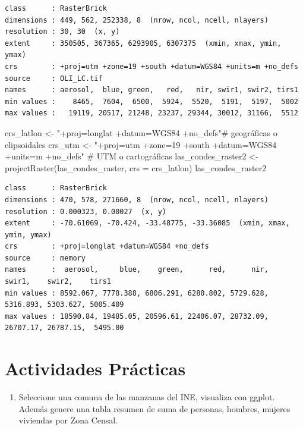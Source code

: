 \documentclass[
  letterpaper,
  DIV=11,
  numbers=noendperiod]{scrreprt}
\newenvironment{Shaded}{\begin{snugshade}}{\end{snugshade}}
\newcommand{\AttributeTok}[1]{\textcolor[rgb]{0.40,0.45,0.13}{#1}}
\newcommand{\CommentTok}[1]{\textcolor[rgb]{0.37,0.37,0.37}{#1}}
\newcommand{\FunctionTok}[1]{\textcolor[rgb]{0.28,0.35,0.67}{#1}}
\newcommand{\NormalTok}[1]{\textcolor[rgb]{0.00,0.23,0.31}{#1}}
\newcommand{\OtherTok}[1]{\textcolor[rgb]{0.00,0.23,0.31}{#1}}
\newcommand{\StringTok}[1]{\textcolor[rgb]{0.13,0.47,0.30}{#1}}
\providecommand{\tightlist}{%
  \setlength{\itemsep}{0pt}\setlength{\parskip}{0pt}}\usepackage{longtable,booktabs,array}
\begin{document}
\begin{verbatim}
class      : RasterBrick 
dimensions : 449, 562, 252338, 8  (nrow, ncol, ncell, nlayers)
resolution : 30, 30  (x, y)
extent     : 350505, 367365, 6293905, 6307375  (xmin, xmax, ymin, ymax)
crs        : +proj=utm +zone=19 +south +datum=WGS84 +units=m +no_defs 
source     : OLI_LC.tif 
names      : aerosol,  blue, green,   red,   nir, swir1, swir2, tirs1 
min values :    8465,  7604,  6500,  5924,  5520,  5191,  5197,  5002 
max values :   19119, 20517, 21248, 23237, 29344, 30012, 31166,  5512 
\end{verbatim}

\begin{Shaded}
\begin{Highlighting}[]
\NormalTok{crs\_latlon }\OtherTok{\textless{}{-}} \StringTok{"+proj=longlat +datum=WGS84 +no\_defs"}\CommentTok{\# geográficas o elipsoidales}
\NormalTok{crs\_utm }\OtherTok{\textless{}{-}} \StringTok{"+proj=utm +zone=19 +south +datum=WGS84 +units=m +no\_defs"} \CommentTok{\# UTM o cartográficas}
\NormalTok{las\_condes\_raster2 }\OtherTok{\textless{}{-}} \FunctionTok{projectRaster}\NormalTok{(las\_condes\_raster, }\AttributeTok{crs =}\NormalTok{ crs\_latlon)}
\NormalTok{las\_condes\_raster2}
\end{Highlighting}
\end{Shaded}

\begin{verbatim}
class      : RasterBrick 
dimensions : 470, 578, 271660, 8  (nrow, ncol, ncell, nlayers)
resolution : 0.000323, 0.00027  (x, y)
extent     : -70.61069, -70.424, -33.48775, -33.36085  (xmin, xmax, ymin, ymax)
crs        : +proj=longlat +datum=WGS84 +no_defs 
source     : memory
names      :  aerosol,     blue,    green,      red,      nir,    swir1,    swir2,    tirs1 
min values : 8592.067, 7778.388, 6806.291, 6280.802, 5729.628, 5316.893, 5303.627, 5005.409 
max values : 18590.84, 19485.05, 20596.61, 22406.07, 28732.09, 26707.17, 26787.15,  5495.00 
\end{verbatim}

\hypertarget{actividades-pruxe1cticas}{%
\section{Actividades Prácticas}\label{actividades-pruxe1cticas}}

\begin{enumerate}
\def\labelenumi{\arabic{enumi}.}
\tightlist
\item
  Seleccione una comuna de las manzanas del INE, visualiza con ggplot.
  Además genere una tabla resumen de suma de personas, hombres, mujeres
  viviendas por Zona Censal.
\end{enumerate}
\end{document}
